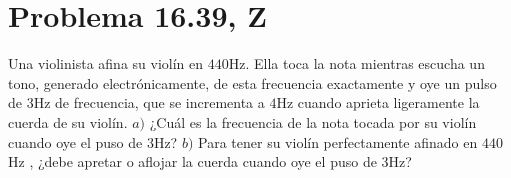 \section*{Problema 16.39, Z}


Una violinista afina su violín en $440$Hz. Ella toca la nota mientras escucha un tono, generado electrónicamente, de esta frecuencia exactamente y oye un pulso de $3$Hz de frecuencia, que se incrementa a $4$Hz cuando aprieta ligeramente la cuerda de su violín. $a)$ ¿Cuál es la frecuencia de la nota tocada por su violín cuando oye el puso de $3$Hz? $b)$ Para tener su violín perfectamente afinado en $440$Hz , ¿debe apretar o aflojar la cuerda cuando oye el puso de $3$Hz?




